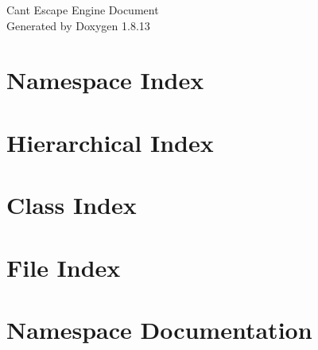 \documentclass[twoside]{book}
\newcommand{\+}{\discretionary{\mbox{\scriptsize$\hookleftarrow$}}{}{}}
\newcommand{\clearemptydoublepage}{%
  \newpage{\pagestyle{empty}\cleardoublepage}%
}
\begin{document}
\hypersetup{pageanchor=false,
             bookmarksnumbered=true,
             pdfencoding=unicode
            }
\begin{titlepage}
\vspace*{7cm}
\begin{center}%
{\Large Cant Escape Engine Document }\\
\vspace*{1cm}
{\large Generated by Doxygen 1.8.13}\\
\end{center}
\end{titlepage}
\clearemptydoublepage
{}
\tableofcontents
\clearemptydoublepage
{}
\hypersetup{pageanchor=true}

\chapter{Namespace Index}

\chapter{Hierarchical Index}

\chapter{Class Index}

\chapter{File Index}

\chapter{Namespace Documentation}




\end{document}
